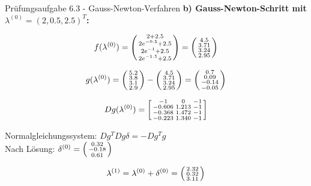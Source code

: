\begin{example2}{Prüfungsaufgabe 6.3 - Gauss-Newton-Verfahren}
\textbf{b) Gauss-Newton-Schritt mit $\lambda^{(0)} = (2, 0.5, 2.5)^T$:}

$$f(\lambda^{(0)}) = \begin{psmallmatrix} 2 + 2.5 \\ 2e^{-0.5} + 2.5 \\ 2e^{-1} + 2.5 \\ 2e^{-1.5} + 2.5 \end{psmallmatrix} = \begin{psmallmatrix} 4.5 \\ 3.71 \\ 3.24 \\ 2.95 \end{psmallmatrix}$$

$$g(\lambda^{(0)}) = \begin{psmallmatrix} 5.2 \\ 3.8 \\ 3.1 \\ 2.9 \end{psmallmatrix} - \begin{psmallmatrix} 4.5 \\ 3.71 \\ 3.24 \\ 2.95 \end{psmallmatrix} = \begin{psmallmatrix} 0.7 \\ 0.09 \\ -0.14 \\ -0.05 \end{psmallmatrix}$$

$$Dg(\lambda^{(0)}) = \begin{bsmallmatrix}
-1 & 0 & -1 \\
-0.606 & 1.213 & -1 \\
-0.368 & 1.472 & -1 \\
-0.223 & 1.340 & -1
\end{bsmallmatrix}$$

Normalgleichungssystem: $Dg^T Dg \delta = -Dg^T g$
\vspace{4mm}\\
Nach Lösung: $\delta^{(0)} = \begin{psmallmatrix} 0.32 \\ -0.18 \\ 0.61 \end{psmallmatrix}$

$$\lambda^{(1)} = \lambda^{(0)} + \delta^{(0)} = \begin{psmallmatrix} 2.32 \\ 0.32 \\ 3.11 \end{psmallmatrix}$$


\end{example2}
